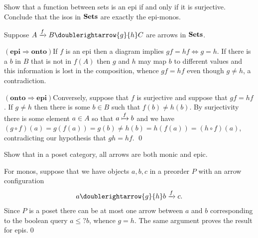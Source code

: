 \setcounter{booksection}{2}
\begin{bookproblem}
  Show that a function between sets is an epi if and only if it is surjective.
  Conclude that the isos in \(\mathbf{{Sets}}\) are exactly the epi-monos.\\
  
  \begin{Solution}
    Suppose   \(A \xto{f} B \doublerightarrow{g}{h} C\) are arrows in \(\mathbf{{Sets}}\).  
    
    \((\textbf{epi} \Rightarrow \textbf{onto})\)\quad If \(f\) is an epi then a
    diagram implies \(gf = hf \iff g = h\). If there is a \(b\) in \(B\) that is
    not in \(f(A)\) then \(g\) and \(h\) may map \(b\) to different values and
    this information is lost in the composition, whence \(gf = hf\) even though
    \(g \not= h\), a contradiction.

    \((\textbf{onto} \Rightarrow \textbf{epi})\)\quad Conversely, suppose that
    \(f\) is surjective and suppose that \(gf = hf\). If \(g \not= h\) then
    there is some \(b \in B\) such that \(f(b) \not= h(b)\). By surjectivity
    there is some element \(a \in A\) so that \(a \xmapsto{f} b\) and we have
    \((g\circ f)(a) = g(f(a)) = g(b) \not= h(b) = h(f(a)) = (h\circ f)(a)\),
    contradicting our hypothesis that \(gh = hf\). \qed{}
  \end{Solution}
\end{bookproblem}

\begin{bookproblem}
  Show that in a poset category, all arrows are both monic and epic.\\

  \begin{Solution}
    For monos, suppose that we have objects \(a,b,c\) in a preorder \(P\) with
    an arrow configuration
    \[a\doublerightarrow{g}{h} b \xto{f} c.\]
    Since \(P\) is a poset there can be at most one arrow between \(a\) and
    \(b\) corresponding to the boolean query \(a \leq? b\), whence \(g = h\).
    The same argument proves the result for epis.\qed{}
  \end{Solution}
\end{bookproblem}


